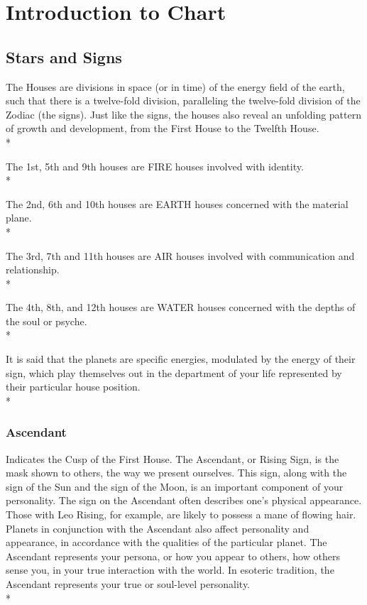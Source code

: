 \documentclass[12pt,twoside,openright]{memoir}
\begin{document}
\part{Introduction to Chart}                   %
\chapter{Stars and Signs}                %

The Houses are divisions in space (or in time) of the energy field of the earth, such that there is a twelve-fold division, paralleling the twelve-fold division of the Zodiac (the signs). Just like the signs, the houses also reveal an unfolding pattern of growth and development, from the First House to the Twelfth House.\\*

The 1st, 5th and 9th houses are FIRE houses involved with identity.\\*

The 2nd, 6th and 10th houses are EARTH houses concerned with the material plane. \\*

The 3rd, 7th and 11th houses are AIR houses involved with communication and relationship. \\*

The 4th, 8th, and 12th houses are WATER houses concerned with the depths of the soul or psyche. \\*

It is said that the planets are specific energies, modulated by the energy of their sign, which play themselves out in the department of your life represented by their particular house position. \\*


\section {Ascendant}
Indicates the Cusp of the First House. The Ascendant, or Rising Sign, is the mask shown to others, the way we present ourselves. This sign, along with the sign of the Sun and the sign of the Moon, is an important component of your personality. The sign on the Ascendant often describes one's physical appearance. Those with Leo Rising, for example, are likely to possess a mane of flowing hair. Planets in conjunction with the Ascendant also affect personality and appearance, in accordance with the qualities of the particular planet. The Ascendant represents your persona, or how you appear to others, how others sense you, in your true interaction with the world. In esoteric tradition, the Ascendant represents your true or soul-level personality.\\*
\end{document}
